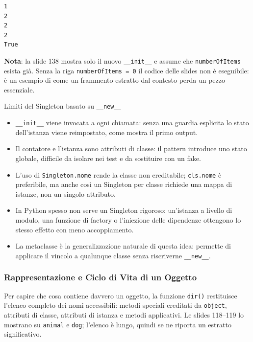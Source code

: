 \documentclass[12pt]{extarticle}
\begin{document}
\begin{lstlisting}[numbers=none]
1
2
2
2
True
\end{lstlisting}

\noindent \textbf{Nota}: la slide 138 mostra solo il nuovo \texttt{\_\_init\_\_} e assume che \texttt{numberOfItems} esista già. Senza la riga \texttt{numberOfItems = 0} il codice delle slides non è eseguibile: è un esempio di come un frammento estratto dal contesto perda un pezzo essenziale.

\begin{cbox}{Limiti del Singleton basato su \texttt{\_\_new\_\_}}
\begin{itemize}
    \item \texttt{\_\_init\_\_} viene invocata a ogni chiamata: senza una guardia esplicita lo stato dell'istanza viene reimpostato, come mostra il primo output.
    \item Il contatore e l'istanza sono attributi di classe: il pattern introduce uno stato globale, difficile da isolare nei test e da sostituire con un fake.
    \item L'uso di \texttt{Singleton.nome} rende la classe non ereditabile; \texttt{cls.nome} è preferibile, ma anche così un Singleton per classe richiede una mappa di istanze, non un singolo attributo.
    \item In Python spesso non serve un Singleton rigoroso: un'istanza a livello di modulo, una funzione di factory o l'iniezione delle dipendenze ottengono lo stesso effetto con meno accoppiamento.
    \item La metaclasse è la generalizzazione naturale di questa idea: permette di applicare il vincolo a qualunque classe senza riscriverne \texttt{\_\_new\_\_}.
\end{itemize}
\end{cbox}

\subsubsection{Rappresentazione e Ciclo di Vita di un Oggetto}

\noindent Per capire che cosa contiene davvero un oggetto, la funzione \texttt{dir()} restituisce l'elenco completo dei nomi accessibili: metodi speciali ereditati da \texttt{object}, attributi di classe, attributi di istanza e metodi applicativi. Le slides 118--119 lo mostrano su \texttt{animal} e \texttt{dog}; l'elenco è lungo, quindi se ne riporta un estratto significativo.
\end{document}
